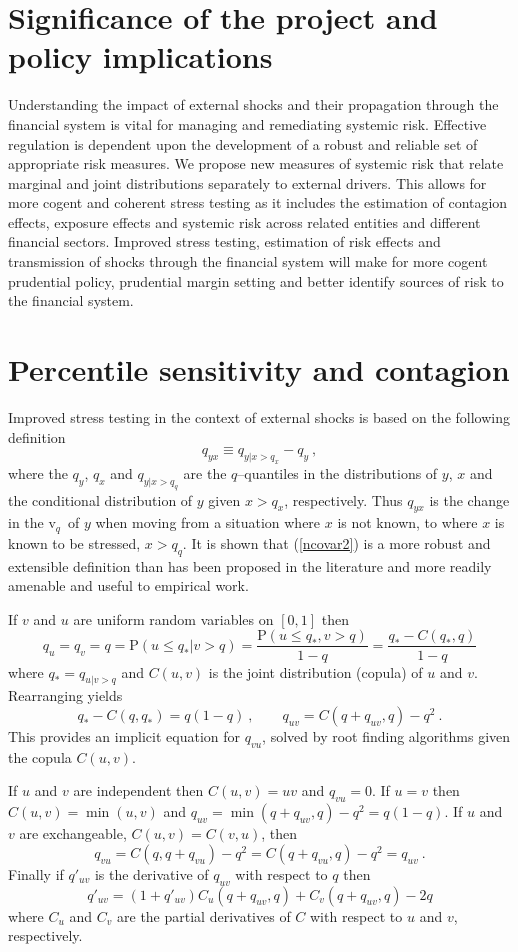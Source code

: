 \documentclass[authoryear]{elsarticle}
\newcommand{\be}{\begin{equation}}
\newcommand{\ee}{\end{equation}}
\renewcommand{\v}{\ensuremath{\mathrm{v}_q}}
\newcommand{\eref}[1]{(\ref{#1})}
\newcommand{\cq}{\ , \qquad}
\renewcommand{\P}{\mathrm{P}}
\begin{document}
\section{Significance of the project and  policy implications}

Understanding the impact of external shocks and their propagation through   the financial system is vital for managing and remediating systemic risk. Effective regulation is dependent upon the development of a robust and reliable set of appropriate risk measures.  We propose new measures of systemic risk that relate marginal and joint distributions separately to external drivers. This allows for more cogent and coherent stress testing as it includes the estimation of contagion effects, exposure effects and systemic risk across related entities and different financial sectors. Improved stress testing, estimation of risk effects and transmission of shocks through the financial system will make for more cogent prudential policy, prudential margin setting and better identify sources of risk to the financial system.

\section{Percentile sensitivity and contagion}

Improved stress testing in the context of  external shocks is based on the following definition
\be\label{ncovar2}
q_{yx} \equiv q_{y|x>q_x} - q_y\ ,
\ee 
where the $q_y$, $q_x$ and $q_{y|x>q_q}$ are the $q$--quantiles in the distributions of $y$, $x$ and the conditional distribution of $y$ given $x>q_x$, respectively.
Thus  $q_{yx}$ is the change in the \v\ of $y$ when moving from a situation where $x$ is not known, to where  $x$ is known to be stressed, $x>q_q$. 
It is shown  that \eref{ncovar2} is a more robust and extensible definition than has been proposed in the literature  and more readily amenable and useful to empirical work. 

If $v$ and $u$ are uniform random variables on $[0,1]$ then  
\be\label{Qdef}
q_u=q_v= q=\P(u\le q_*|v>q) =  \frac{\P(u\le q_*,v>q)}{1-q}  = \frac{q_*-C(q_*,q)}{1-q}
\ee
where $q_*=q_{u|v>q}$ and $C(u,v)$ is the joint distribution (copula) of $u$ and $v$.
Rearranging yields
\be\label{uplus}
q_* -C(q,q_*)= q(1-q)\cq q_{uv}=C(q+q_{uv},q)-q^2\ .
\ee
This provides an implicit equation for $q_{vu}$, solved by  root finding algorithms given the copula $C(u,v)$.

If $u$ and $v$ are independent then $C(u,v)=uv$ and  $q_{vu}=0$.   If $u=v$ then $C(u,v)=\min(u,v)$ and  $q_{uv}
=\min(q+q_{uv},q)-q^2=q(1-q)$.  If $u$ and $v$ are exchangeable, $C(u,v)=C(v,u)$, then 
$$
q_{vu} = C(q,q+q_{vu})-q^2=C(q+q_{vu},q)-q^2=q_{uv}\ .
$$
Finally  if $q'_{uv}$ is the derivative of $q_{uv}$ with respect to $q$ then
$$
q'_{uv}= (1+q'_{uv})C_u(q+q_{uv},q)+C_v(q+q_{uv},q)-2q
$$
where $C_u$ and $C_v$ are the partial derivatives of $C$ with respect to $u$ and $v$, respectively.
\end{document}
